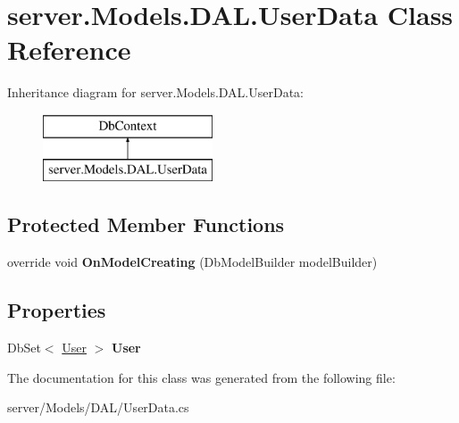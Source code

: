 \hypertarget{classserver_1_1Models_1_1DAL_1_1UserData}{\section{server.\-Models.\-D\-A\-L.\-User\-Data Class Reference}
\label{classserver_1_1Models_1_1DAL_1_1UserData}
}
Inheritance diagram for server.\-Models.\-D\-A\-L.\-User\-Data\-:\begin{figure}[H]
\begin{center}
\leavevmode
\includegraphics[height=2.000000cm]{classserver_1_1Models_1_1DAL_1_1UserData}
\end{center}
\end{figure}
\subsection*{Protected Member Functions}
\begin{DoxyCompactItemize}
\item 
\hypertarget{classserver_1_1Models_1_1DAL_1_1UserData_a1b1a9d294a8f0f6e648fcef6f6a508e6}{override void {\bfseries On\-Model\-Creating} (Db\-Model\-Builder model\-Builder)}\label{classserver_1_1Models_1_1DAL_1_1UserData_a1b1a9d294a8f0f6e648fcef6f6a508e6}

\end{DoxyCompactItemize}
\subsection*{Properties}
\begin{DoxyCompactItemize}
\item 
\hypertarget{classserver_1_1Models_1_1DAL_1_1UserData_a5d06db4f55c5d0caf5afd1723e788af8}{Db\-Set$<$ \hyperlink{classserver_1_1Models_1_1User}{User} $>$ {\bfseries User}}\label{classserver_1_1Models_1_1DAL_1_1UserData_a5d06db4f55c5d0caf5afd1723e788af8}

\end{DoxyCompactItemize}


The documentation for this class was generated from the following file\-:\begin{DoxyCompactItemize}
\item 
server/\-Models/\-D\-A\-L/User\-Data.\-cs\end{DoxyCompactItemize}
